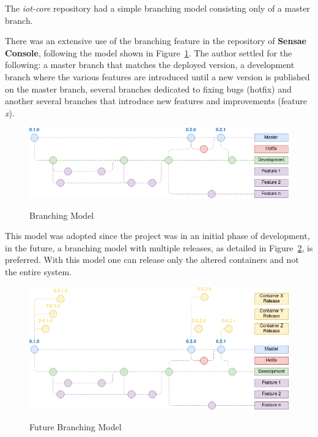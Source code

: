 The \textit{iot-core} repository had a simple branching model consisting only of a master branch.

There was an extensive use of the branching feature in the repository of \textbf{Sensae Console}, following the model shown in Figure~\ref{fig:implementation:decisions:git:branch}. The author settled for the following: a master branch that matches the deployed version, a development branch where the various features are introduced until a new version is published on the master branch, several branches dedicated to fixing bugs (hotfix) and another several branches that introduce new features and improvements (feature \textit{x}).

\begin{figure}[H]
    \centering
    \resizebox{\columnwidth}{!}
    {
       \includegraphics{assets/figures/branching-model.png}
    }
    \caption[Branching Model]{Branching Model}
    \label{fig:implementation:decisions:git:branch}
\end{figure}

This model was adopted since the project was in an initial phase of development, in the future, a branching model with multiple releases, as detailed in Figure~\ref{fig:implementation:decisions:git:branch2}, is preferred. With this model one can release only the altered containers and not the entire system.

\begin{figure}[H]
    \centering
    \resizebox{\columnwidth}{!}
    {
       \includegraphics{assets/figures/branching-model-2.png}
    }
    \caption[Future Branching Model]{Future Branching Model}
    \label{fig:implementation:decisions:git:branch2}
\end{figure}

